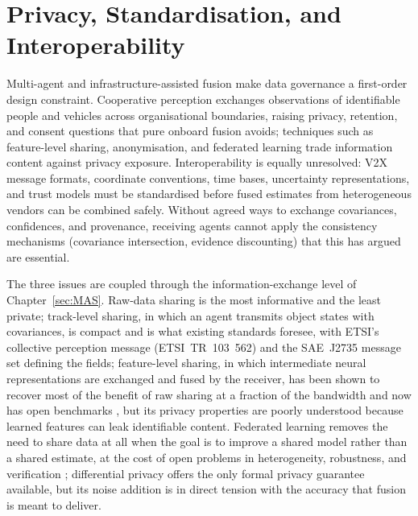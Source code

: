 \section{Privacy, Standardisation, and Interoperability}
\label{subsec:oc-privacy}
Multi-agent and infrastructure-assisted fusion make data governance a first-order design constraint. Cooperative perception exchanges observations of identifiable people and vehicles across organisational boundaries, raising privacy, retention, and consent questions that pure onboard fusion avoids; techniques such as feature-level sharing, anonymisation, and federated learning trade information content against privacy exposure. Interoperability is equally unresolved: V2X message formats, coordinate conventions, time bases, uncertainty representations, and trust models must be standardised before fused estimates from heterogeneous vendors can be combined safely. Without agreed ways to exchange covariances, confidences, and provenance, receiving agents cannot apply the consistency mechanisms (covariance intersection, evidence discounting) that this  has argued are essential.

The three issues are coupled through the information-exchange level of Chapter~\ref{sec:MAS}. Raw-data sharing is the most informative and the least private; track-level sharing, in which an agent transmits object states with covariances, is compact and is what existing standards foresee, with ETSI's collective perception message (ETSI~TR~103~562) and the SAE~J2735 message set defining the fields; feature-level sharing, in which intermediate neural representations are exchanged and fused by the receiver, has been shown to recover most of the benefit of raw sharing at a fraction of the bandwidth \cite{wang2020_v2vnet} and now has open benchmarks \cite{xu2022_opv2v}, but its privacy properties are poorly understood because learned features can leak identifiable content. Federated learning \cite{mcmahan2017_fedavg} removes the need to share data at all when the goal is to improve a shared model rather than a shared estimate, at the cost of open problems in heterogeneity, robustness, and verification \cite{kairouz2021_federated}; differential privacy \cite{dwork2006_dp,dwork2014_algorithmic_dp} offers the only formal privacy guarantee available, but its noise addition is in direct tension with the accuracy that fusion is meant to deliver.

